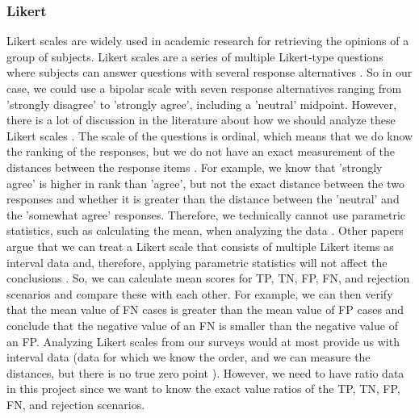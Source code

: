 \documentclass[a4paper]{article}
\begin{document}
\subsubsection{Likert}
\label{sec:likert}
Likert scales are widely used in academic research for retrieving the opinions of a group of subjects. Likert scales are a series of multiple Likert-type questions where subjects can answer questions with several response alternatives \cite{boone2012analyzing}. So in our case, we could use a bipolar scale with seven response alternatives ranging from 'strongly disagree' to 'strongly agree', including a 'neutral' midpoint. However, there is a lot of discussion in the literature about how we should analyze these Likert scales \cite{boone2012analyzing, allen2007likert, norman2010likert, murray2013likert}. The scale of the questions is ordinal, which means that we do know the ranking of the responses, but we do not have an exact measurement of the distances between the response items \cite{allen2007likert}. For example, we know that 'strongly agree' is higher in rank than 'agree', but not the exact distance between the two responses and whether it is greater than the distance between the 'neutral' and the 'somewhat agree' responses. Therefore, we technically cannot use parametric statistics, such as calculating the mean, when analyzing the data \cite{allen2007likert}. Other papers argue that we can treat a Likert scale that consists of multiple Likert items as interval data and, therefore, applying parametric statistics will not affect the conclusions \cite{boone2012analyzing, norman2010likert, murray2013likert}. So, we can calculate mean scores for TP, TN, FP, FN, and rejection scenarios and compare these with each other. For example, we can then verify that the mean value of FN cases is greater than the mean value of FP cases and conclude that the negative value of an FN is smaller than the negative value of an FP. Analyzing Likert scales from our surveys would at most provide us with interval data (data for which we know the order, and we can measure the distances, but there is no true zero point \cite{allen2007likert}). However, we need to have ratio data in this project since we want to know the exact value ratios of the TP, TN, FP, FN, and rejection scenarios.
\end{document}
